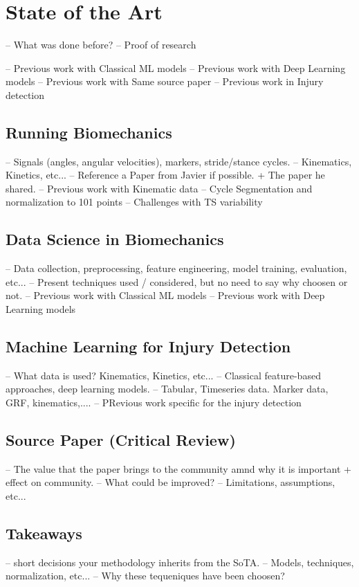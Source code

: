 \chapter{State of the Art}\label{chap:state-of-the-art}
-- What was done before?
-- Proof of research

-- Previous work with Classical ML models
-- Previous work with Deep Learning models
-- Previous work with Same source paper
-- Previous work in Injury detection

\section{Running Biomechanics}\label{sec:sota-biomechanics}
-- Signals (angles, angular velocities), markers, stride/stance cycles.
-- Kinematics, Kinetics, etc...
-- Reference a Paper from Javier if possible. + The paper he shared.
-- Previous work with Kinematic data
-- Cycle Segmentation and normalization to 101 points
    -- Challenges with TS variability

\section{Data Science in Biomechanics}\label{sec:sota-data-science}
-- Data collection, preprocessing, feature engineering, model training, evaluation, etc...
-- Present techniques used / considered, but no need to say why choosen or not.
-- Previous work with Classical ML models
-- Previous work with Deep Learning models

\section{Machine Learning for Injury Detection}\label{sec:sota-ml-injury-detection}
-- What data is used? Kinematics, Kinetics, etc...
-- Classical feature-based approaches, deep learning models.
-- Tabular, Timeseries data. Marker data, GRF, kinematics,....
-- PRevious work specific for the injury detection

\section{Source Paper (Critical Review)}\label{sec:sota-source-paper}
-- The value that the paper brings to the community amnd why it is important + effect on community.
-- What could be improved?
-- Limitations, assumptions, etc...

\section{Takeaways}\label{sec:sota-methodological-takeaways}
-- short decisions your methodology inherits from the SoTA.
-- Models, techniques, normalization, etc...
-- Why these tequeniques have been choosen?

